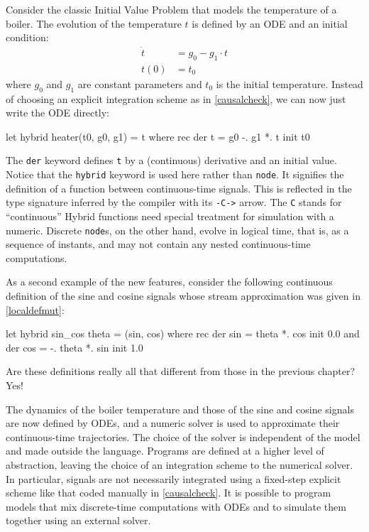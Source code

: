 \documentclass[11pt,titlepage,twoside]{report}
\makeatletter
\newcommand{\zls}[1]{{\@span{class="zelusinline"}#1}}
\newcommand{\zls}[1]{\texttt{#1}}
\renewcommand{\zls}[1]{\texttt{#1}}
\makeatother
\begin{document}
Consider the classic Initial Value Problem that models the temperature
of a boiler.
The evolution of the temperature $t$ is defined by an ODE and 
an initial condition:
\begin{align*}
\dot{t} &= g_0 - g_1 \cdot t \\
t(0)    &= t_0
\end{align*}
where $g_0$ and $g_1$ are constant parameters and 
$t_0$ is the initial temperature.
Instead of choosing an explicit integration scheme as in \cref{causalcheck}, we 
can now just write the ODE directly:
\begin{chklisting}[withresult]
let hybrid heater(t0, g0, g1) = t where
  rec der t = g0 -. g1 *. t init t0
\end{chklisting}

The \zls{der} keyword defines \zls{t} by a (continuous) derivative and an 
initial value.
Notice that the \zls{hybrid} keyword is used here rather than \zls{node}.
It signifies the definition of a function between continuous-time signals.
This is reflected in the type signature inferred by the compiler with its
\zls{-C->} arrow.
The \zls{C} stands for ``continuous''
Hybrid functions need special treatment for simulation with a numeric.
Discrete \zls{node}s, on the other hand, evolve in logical time, that is, as 
a sequence of instants, and may not contain any nested continuous-time 
computations.

As a second example of the new features, consider the following continuous 
definition of the sine and cosine signals whose stream approximation was 
given in \cref{localdefmut}:
\begin{chklisting}[withresult]
let hybrid sin_cos theta = (sin, cos) where
  rec der sin = theta *. cos init 0.0
  and der cos = -. theta *. sin init 1.0
\end{chklisting}

Are these definitions really all that different from those in the previous 
chapter? Yes!

\medskip
The dynamics of the boiler temperature and those of the sine and cosine 
signals are now defined by ODEs, and a numeric solver is used to approximate 
their continuous-time trajectories.
The choice of the solver is independent of the model and made outside the 
language.
Programs are defined at a higher level of abstraction, leaving the choice of 
an integration scheme to the numerical solver.
In particular, signals are not necessarily integrated using a fixed-step 
explicit scheme like that coded manually in \cref{causalcheck}.
It is possible to program models that mix discrete-time computations with 
ODEs and to simulate them together using an external solver.
\end{document}

